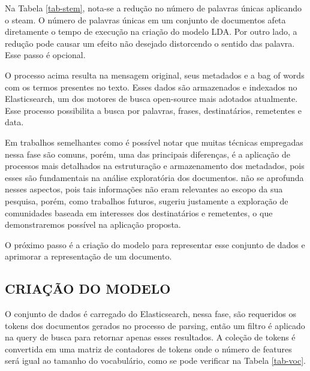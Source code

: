 \documentclass[12pt,a4paper]{article}
\begin{document}
\begin{enumerate}
Na Tabela \ref{tab-stem}, nota-se a redução no número de palavras únicas aplicando o steam. O número de palavras únicas em um conjunto de documentos afeta diretamente o tempo de execução na criação do modelo LDA.
 Por outro lado, a redução pode causar um efeito não desejado distorcendo o sentido das palavra. Esse passo é opcional.
\end{enumerate}


O processo acima resulta na mensagem original, seus metadados e a bag of words com os termos presentes no texto. Esses dados são armazenados e indexados no Elasticsearch,
 um dos motores de busca open-source mais adotados atualmente. Esse processo possibilita a busca por palavras, frases, destinatários, remetentes e data. 

Em trabalhos semelhantes como  é possível notar que muitas técnicas empregadas nessa fase são comuns, porém, uma das principais diferenças,
 é a aplicação de processos mais detalhados na estruturação e armazenamento dos metadados, pois esses são fundamentais na análise exploratória dos documentos.
  não se aprofunda nesses aspectos, pois tais informações não eram relevantes ao escopo da sua pesquisa,
 porém, como trabalhos futuros, sugeriu justamente a exploração de comunidades baseada em interesses dos destinatários e remetentes, o que demonstraremos possível na aplicação proposta.

O próximo passo é a criação do modelo para representar esse conjunto de dados e aprimorar a representação de um documento.



\subsection{CRIAÇÃO DO MODELO} \label{sec:criacao-modelo}

O conjunto de dados é carregado do Elasticsearch, nessa fase, são requeridos os tokens dos documentos gerados no processo de parsing, então
 um filtro é aplicado na query de busca para retornar apenas esses resultados. A coleção de tokens é convertida em uma matriz de contadores de tokens onde o número de features será igual ao tamanho do vocabulário, como se pode verificar na Tabela \ref{tab-voc}.
\end{document}
